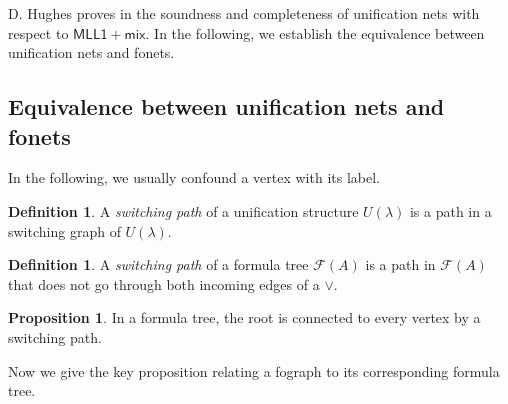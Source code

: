 \documentclass[conference,twosided,10pt]{IEEEtran}
\theoremstyle{definition}
\newtheorem{definition}[thm]{Definition}
\newtheorem{proposition}[thm]{Proposition}
\newcommand*{\FOMLLm}{\mathsf{MLL1 + mix}}
\newcommand{\FT}{\mathcal{F}}
\begin{document}
D. Hughes proves in \cite{Hughes 2019} the soundness and completeness of
unification nets with respect to $\FOMLLm$. In the following, we establish the
equivalence between unification nets and fonets.

\subsection{Equivalence between unification nets and fonets}
In the following, we usually confound a vertex with its label. 

\begin{definition} A \textit{switching path} of a unification structure $U(\lambda)$ is a path in a switching graph of $U(\lambda)$.
\end{definition}

\begin{definition} A \textit{switching path} of a  formula tree $\FT(A)$ is a
	path in $\FT(A)$ that does not go through both incoming edges of a $\vee$.
\end{definition}

\begin{proposition}
\label{prop1}
In a formula tree, the root is connected to every vertex by a switching path.
\end{proposition}

Now we give the key proposition relating a fograph to its corresponding formula
tree.
\end{document}
